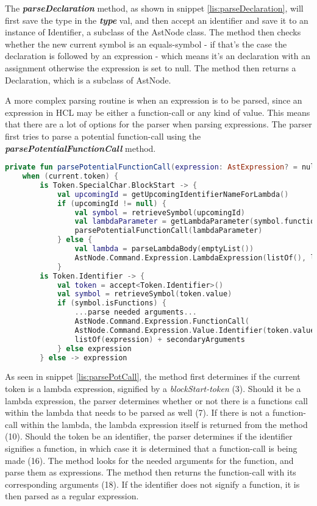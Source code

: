 The \textbf{\textit{parseDeclaration}} method, as shown in snippet \ref{lis:parseDeclaration}, will first save the type in the \textbf{\textit{type}} val, and then accept an identifier and save it to an instance of Identifier, a subclass of the AstNode class. 
The method then checks whether the new current symbol is an equals-symbol - if that's the case the declaration is followed by an expression - which means it's an declaration with an assignment otherwise the expression is set to null. 
The method then returns a Declaration, which is a subclass of AstNode.  

A more complex parsing routine is when an expression is to be parsed, since an expression in HCL may be either a function-call or any kind of value.
This means that there are a lot of options for the parser when parsing expressions.
The parser first tries to parse a potential function-call using the \textbf{\textit{parsePotentialFunctionCall}} method.

\begin{lstlisting}[language=Kotlin,label=lis:parsePotCall,caption=A simplified version of the parsePotentialFunctionCall method from the parser.]
private fun parsePotentialFunctionCall(expression: AstExpression? = null): AstExpression =
    when (current.token) {
        is Token.SpecialChar.BlockStart -> {
            val upcomingId = getUpcomingIdentifierNameForLambda()
            if (upcomingId != null) {
                val symbol = retrieveSymbol(upcomingId)
                val lambdaParameter = getLambdaParameter(symbol.functions, 0)
                parsePotentialFunctionCall(lambdaParameter)
            } else {
                val lambda = parseLambdaBody(emptyList())
                AstNode.Command.Expression.LambdaExpression(listOf(), lambda.type, lambda.lambdaBody)
            }
        is Token.Identifier -> {
            val token = accept<Token.Identifier>()
            val symbol = retrieveSymbol(token.value)
            if (symbol.isFunctions) {
        	    ...parse needed arguments...
        	    AstNode.Command.Expression.FunctionCall(
        	    AstNode.Command.Expression.Value.Identifier(token.value),
        	    listOf(expression) + secondaryArguments
            } else expression
        } else -> expression
\end{lstlisting}

As seen in snippet \ref{lis:parsePotCall}, the method first determines if the current token is a lambda expression, signified by a \textit{blockStart-token} (3).
Should it be a lambda expression, the parser determines whether or not there is a functions call within the lambda that needs to be parsed as well (7).
If there is not a function-call within the lambda, the lambda expression itself is returned from the method (10). 
Should the token be an identifier, the parser determines if the identifier signifies a function, in which case it is determined that a function-call is being made (16).
The method looks for the needed arguments for the function, and parse them as expressions.
The method then returns the function-call with its corresponding arguments (18).
If the identifier does not signify a function, it is then parsed as a regular expression.

